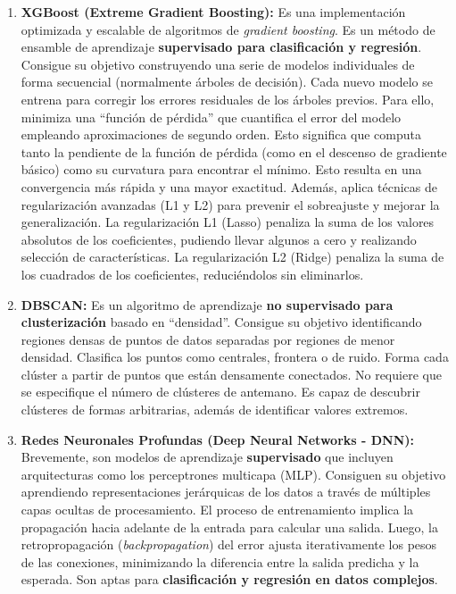 \begin{enumerate}
\begin{enumerate}
		\item \textbf{XGBoost (Extreme Gradient Boosting):}
		Es una implementación optimizada y escalable de algoritmos de \textit{gradient boosting}. Es un método de ensamble de aprendizaje \textbf{supervisado para clasificación y regresión}. Consigue su objetivo construyendo una serie de modelos individuales de forma secuencial (normalmente árboles de decisión). Cada nuevo modelo se entrena para corregir los errores residuales de los árboles previos. Para ello, minimiza una ``función de pérdida'' que cuantifica el error del modelo empleando aproximaciones de segundo orden. Esto significa que computa tanto la pendiente de la función de pérdida (como en el descenso de gradiente básico) como su curvatura para encontrar el mínimo. Esto resulta en una convergencia más rápida y una mayor exactitud. Además, aplica técnicas de regularización avanzadas (L1 y L2) para prevenir el sobreajuste y mejorar la generalización. La regularización L1 (Lasso) penaliza la suma de los valores absolutos de los coeficientes, pudiendo llevar algunos a cero y realizando selección de características. La regularización L2 (Ridge) penaliza la suma de los cuadrados de los coeficientes, reduciéndolos sin eliminarlos.

		\item \textbf{DBSCAN:}
		Es un algoritmo de aprendizaje \textbf{no supervisado para clusterización} basado en ``densidad''. Consigue su objetivo identificando regiones densas de puntos de datos separadas por regiones de menor densidad. Clasifica los puntos como centrales, frontera o de ruido. Forma cada clúster a partir de puntos que están densamente conectados. No requiere que se especifique el número de clústeres de antemano. Es capaz de descubrir clústeres de formas arbitrarias, además de identificar valores extremos.

		\item \textbf{Redes Neuronales Profundas (Deep Neural Networks - DNN):}
		Brevemente, son modelos de aprendizaje \textbf{supervisado} que incluyen arquitecturas como los perceptrones multicapa (MLP). Consiguen su objetivo aprendiendo representaciones jerárquicas de los datos a través de múltiples capas ocultas de procesamiento. El proceso de entrenamiento implica la propagación hacia adelante de la entrada para calcular una salida. Luego, la retropropagación (\textit{backpropagation}) del error ajusta iterativamente los pesos de las conexiones, minimizando la diferencia entre la salida predicha y la esperada. Son aptas para \textbf{clasificación y regresión en datos complejos}.


\end{enumerate}
\end{enumerate}
